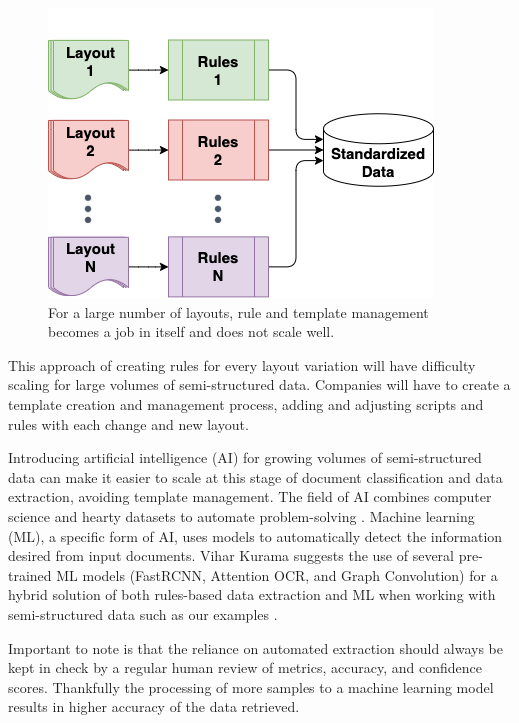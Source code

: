 \documentclass[conference, draftcls]{IEEEtran}
\begin{document}
\begin{figure}[ht]
\centerline{\includegraphics[width=\columnwidth]{RulesFlowN.png}}
\caption{For a large number of layouts, rule and template management becomes a job in itself and does not scale well.}
\label{figRulesFlow3}
\end{figure}

This approach of creating rules for every layout variation will have difficulty scaling for large volumes of semi-structured data. Companies will have to create a template creation and management process, adding and adjusting scripts and rules with each change and new layout.

Introducing artificial intelligence (AI) for growing volumes of semi-structured data can make it easier to scale at this stage of document classification and data extraction, avoiding template management. The field of AI combines computer science and hearty datasets to automate problem-solving \cite{ibm:ai}. Machine learning (ML), a specific form of AI, uses models to automatically detect the information desired from input documents. Vihar Kurama suggests the use of several pre-trained ML models (FastRCNN, Attention OCR, and Graph Convolution) for a hybrid solution of both rules-based data extraction and ML when working with semi-structured data such as our examples \cite{kurama2021a}.

Important to note is that the reliance on automated extraction should always be kept in check by a regular human review of metrics, accuracy, and confidence scores. Thankfully the processing of more samples to a machine learning model results in higher accuracy of the data retrieved.
\end{document}
